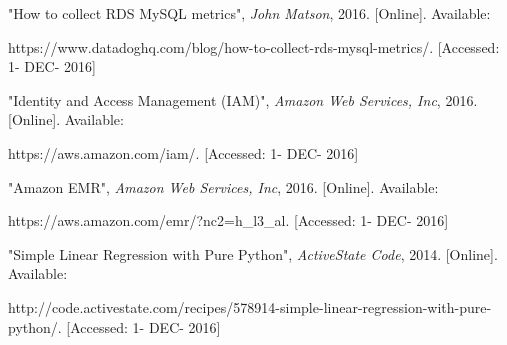 \begin{thebibliography}{10}
	"How to collect RDS MySQL metrics", \textit{John Matson}, 2016. [Online]. Available:
    
https://www.datadoghq.com/blog/how-to-collect-rds-mysql-metrics/. [Accessed: 1- DEC- 2016]
    
    "Identity and Access Management (IAM)", \textit{Amazon Web Services, Inc}, 2016. [Online]. Available:
    
https://aws.amazon.com/iam/. [Accessed: 1- DEC- 2016]
  
 	"Amazon EMR", \textit{Amazon Web Services, Inc}, 2016. [Online]. Available:
    
https://aws.amazon.com/emr/?nc2=h\_l3\_al. [Accessed: 1- DEC- 2016]

	"Simple Linear Regression with Pure Python", \textit{ActiveState Code}, 2014. [Online]. Available:
    
http://code.activestate.com/recipes/578914-simple-linear-regression-with-pure-python/. [Accessed: 1- DEC- 2016]

\end{thebibliography}